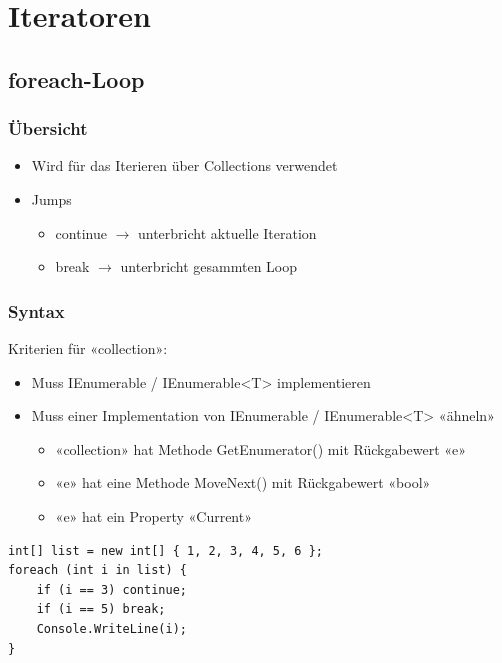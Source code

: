 
\section{Iteratoren}

\subsection{foreach-Loop}
\subsubsection{Übersicht}
\begin{itemize}
    \item Wird für das Iterieren über Collections verwendet
    \item Jumps
    \begin{itemize}
        \item continue $\rightarrow$ unterbricht aktuelle Iteration
        \item break $\rightarrow$ unterbricht gesammten Loop
    \end{itemize}
\end{itemize}
\subsubsection{Syntax}
Kriterien für «collection»:
\begin{itemize}
    \item Muss IEnumerable / IEnumerable<T> implementieren
    \item Muss einer Implementation von IEnumerable / IEnumerable<T> «ähneln»
    \begin{itemize}
        \item «collection» hat Methode GetEnumerator() mit Rückgabewert «e»
        \item «e» hat eine Methode MoveNext() mit Rückgabewert «bool»
        \item «e» hat ein Property «Current»
    \end{itemize}
\end{itemize}
\begin{lstlisting}
int[] list = new int[] { 1, 2, 3, 4, 5, 6 };
foreach (int i in list) {
    if (i == 3) continue;
    if (i == 5) break;
    Console.WriteLine(i);
}
\end{lstlisting}

